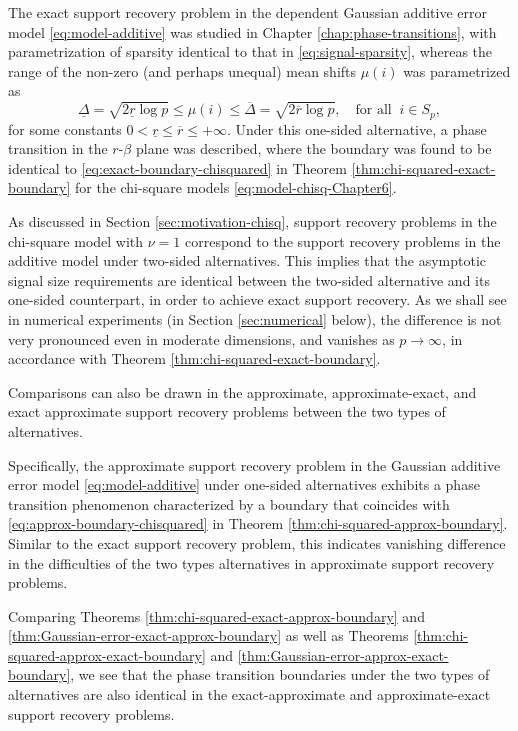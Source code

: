 The exact support recovery problem in the dependent Gaussian additive error model \eqref{eq:model-additive} was studied in Chapter \ref{chap:phase-transitions}, with parametrization of sparsity identical to that in \eqref{eq:signal-sparsity}, whereas the range of the non-zero (and perhaps unequal) mean shifts $\mu(i)$ was parametrized as 
\begin{equation*}
    \underline{\Delta} = \sqrt{2\underline{r}\log{p}}
    \le \mu(i) \le
    \overline{\Delta} = \sqrt{2\overline{r}\log{p}}, \quad \text{for all}\;\;i\in S_p,
\end{equation*}
for some constants $0<\underline{r}\le\overline{r}\le+\infty$.
Under this one-sided alternative, a phase transition in the $r$-$\beta$ plane was described, where the boundary was found to be identical to \eqref{eq:exact-boundary-chisquared} in Theorem \ref{thm:chi-squared-exact-boundary} for the chi-square models \eqref{eq:model-chisq-Chapter6}. 

As discussed in Section \ref{sec:motivation-chisq}, support recovery problems in the chi-square model with $\nu=1$ correspond to the support recovery problems in 
the additive model under two-sided alternatives. This implies that the asymptotic signal size requirements are identical between the two-sided alternative and its 
one-sided counterpart, in order to achieve exact support recovery. As we shall see in numerical experiments (in Section \ref{sec:numerical} below), the difference 
is not very pronounced even in moderate dimensions, and vanishes as $p\to\infty$, in accordance with Theorem \ref{thm:chi-squared-exact-boundary}.

\medskip

Comparisons can also be drawn in the approximate, approximate-exact, and exact approximate support recovery problems between the two types of alternatives.

Specifically, the approximate support recovery problem in the Gaussian additive error model \eqref{eq:model-additive} under one-sided alternatives exhibits a phase transition phenomenon characterized by a boundary that coincides with \eqref{eq:approx-boundary-chisquared} in Theorem \ref{thm:chi-squared-approx-boundary}.
Similar to the exact support recovery problem, this indicates vanishing difference in the difficulties of the two types alternatives in approximate support recovery problems.

Comparing Theorems \ref{thm:chi-squared-exact-approx-boundary} and \ref{thm:Gaussian-error-exact-approx-boundary} as well as
 Theorems \ref{thm:chi-squared-approx-exact-boundary} and \ref{thm:Gaussian-error-approx-exact-boundary}, we see that the phase transition boundaries under the two types of alternatives are also identical in the exact-approximate and approximate-exact support recovery problems.

